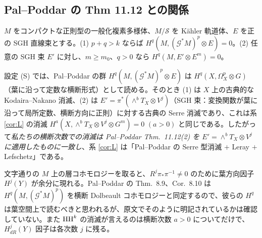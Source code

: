 \subsection{Pal--Poddar の Thm 11.12 との関係}\label{sec:PP}
\begin{thm}\tC
$M$ をコンパクトな正則型の一般化複素多様体、$M/\mathcal S$ を Kähler 軌道体、$E$ を正の SGH 直線束とする。(1) $p+q>k$ ならば $H^q(M,(\mathcal G^*M)^p\otimes E)=0$。(2) 任意の SGH 束 $E'$ に対し、$m\ge m_0$、$q>0$ なら $H^q(M,E'\otimes E^m)=0$。
\end{thm}
\begin{prop}\tP\label{prop:PPcompare}
設定 (S) では、Pal--Poddar の群 $H^q(M,(\mathcal G^*M)^p\otimes E)$ は $H^q(X,\Omega^p_X\otimes G)$（葉に沿って定数な横断形式）として読める。そのとき (1) は $X$ 上の古典的な Kodaira--Nakano 消滅、(2) は $E'=\pi^*(\wedge^bT_X\otimes V^j)$（SGH 束：変換関数が葉に沿って局所定数、横断方向に正則）に対する古典の Serre 消滅であり、これは系 \ref{cor:L} の消滅 $H^a(X,\wedge^bT_X\otimes V^j\otimes G^m)=0$ $(a>0)$ と同じである。したがって\emph{私たちの横断次数での消滅は Pal--Poddar Thm.\ 11.12(2) を $E'=\wedge^bT_X\otimes V^j$ に適用したものに一致し}、系 \ref{cor:L} は「Pal--Poddar の Serre 型消滅 $+$ Leray $+$ Lefschetz」である。
\end{prop}
\begin{rem}[\tQ]
文字通りの $M$ 上の層コホモロジーを取ると、$R^j\pi_*\pi^{-1}\neq0$ のために葉方向因子 $H^j(Y)$ が余分に現れる。Pal--Poddar の Thm.\ 8.9、Cor.\ 8.10 は $H^q(M,(\mathcal G^*M)^p)$ を横断 Dolbeault コホモロジーと同定するので、彼らの $H^q$ は葉空間上で読むべきと思われるが、原文でそのように明記されているかは確認していない。また $\mathrm{HH}^k$ の消滅が言えるのは横断次数 $a>0$ についてだけで、$H^j_{dR}(Y)$ 因子は各次数 $j$ に残る。
\end{rem}

